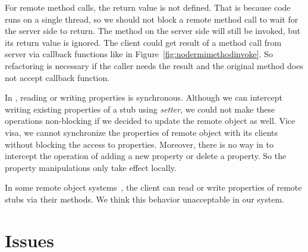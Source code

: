 For remote method calls, the return value is not defined.
That is because \js{} code runs on a single thread, so we should not block
a remote method call to wait for the server side to return.
The method on the server side will still be invoked,
but its return value is ignored.
The client could get result of a method call
from server via callback functions like in Figure~\ref{fig:nodermimethodinvoke}.
So refactoring is necessary if the caller needs the result and
the original method does not accept callback function.

In \js{}, reading or writing properties is synchronous.
Although we can intercept writing existing properties of a stub using
\emph{setter}, we could not make these operations non-blocking if we decided to update
the remote object as well.
Vice visa, we cannot synchronize the properties of remote object with its clients without
blocking the access to properties.
Moreover, there is no way in \js{} to intercept the operation of adding a new property or delete
a property.
So the property manipulations only take effect locally.

In some remote object systems~\cite{birrell1993distributed},
the client can read or write properties of remote stubs via their methods.
We think this behavior unacceptable in our system.



\section{Issues}

